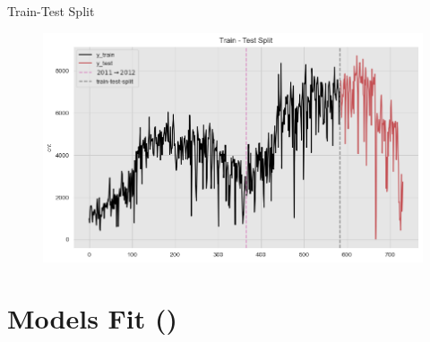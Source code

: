 \documentclass[10pt]{beamer}
\begin{document}
\begin{frame}{Train-Test Split}
\begin{center}
  \begin{figure}
    \includegraphics[scale=0.5]{images/interpretable_ml_25_0.png} 
  \end{figure}
\end{center}
\end{frame}

\section{Models Fit (\cite{interpretable_ml_orduz_2021})}
\end{document}
